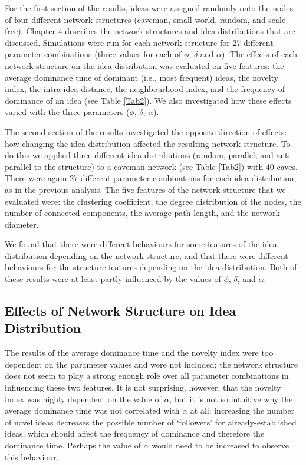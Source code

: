 

For the first section of the results, ideas were assigned randomly onto the nodes of four different network structures (caveman, small world, random, and scale-free). Chapter 4 describes the network structures and idea distributions that are discussed. Simulations were run for each network structure for 27 different parameter combinations (three values for each of $\phi$, $\delta$ and $\alpha$). The effects of each network structure on the idea distribution was evaluated on five features: the average dominance time of dominant (i.e., most frequent) ideas, the novelty index, the intra-idea distance, the neighbourhood index, and the frequency of dominance of an idea (see Table \ref{Tab2}). We also investigated how these effects varied with the three parameters ($\phi$, $\delta$, $\alpha$).

The second section of the results investigated the opposite direction of effects: how changing the idea distribution affected the resulting network structure. To do this we applied three different idea distributions (random, parallel, and anti-parallel to the structure) to a caveman network (see Table \ref{Tab2}) with 40 caves. There were again 27 different parameter combinations for each idea distribution, as in the previous analysis. The five features of the network structure that we evaluated were: the clustering coefficient, the degree distribution of the nodes, the number of connected components, the average path length, and the network diameter. 

We found that there were different behaviours for some features of the idea distribution depending on the network structure, and that there were different behaviours for the structure features depending on the idea distribution. Both of these results were at least partly influenced by the values of $\phi$, $\delta$, and $\alpha$.

\subsection{Effects of Network Structure on Idea Distribution}

The results of the average dominance time and the novelty index were too dependent on the parameter values and were not included; the network structure does not seem to play a strong enough role over all parameter combinations in influencing these two features. It is not surprising, however, that the novelty index was highly dependent on the value of $\alpha$, but it is not so intuitive why the average dominance time was not correlated with $\alpha$ at all: increasing the number of novel ideas decreases the possible number of `followers' for already-established ideas, which should affect the frequency of dominance and therefore the dominance time. Perhaps the value of $\alpha$ would need to be increased to observe this behaviour.

